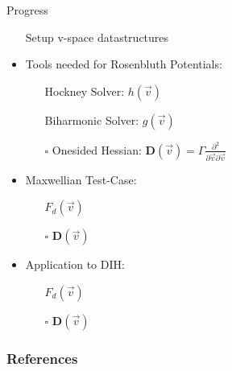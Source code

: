 \begin{frame}{Progress}
    \begin{itemize}
        \item[\done] Setup v-space datastructures 
        \item Tools needed for Rosenbluth Potentials:
        \begin{itemize}
            \item[\done] Hockney Solver: $h(\vec v)$
            \item[\done] Biharmonic Solver: $g(\vec v)$
            \item[$\square$] Onesided Hessian: $\boldsymbol D(\vec v) = \Gamma \frac{\partial^2}{\partial \vec v \partial \vec v}$
        \end{itemize}
        \item Maxwellian Test-Case:
        \begin{itemize}
            \item[\done] $F_d(\vec v)$ 
            \item[$\square$] $\boldsymbol D(\vec v)$ 
        \end{itemize}
        \item Application to DIH:
        \begin{itemize}
            \item[\done] $F_d(\vec v)$
            \item[$\square$] $\boldsymbol D(\vec v)$
        \end{itemize}
    \end{itemize}
\end{frame}

\begin{frame}[allowframebreaks]
	\frametitle{References}
	
	
\end{frame}


